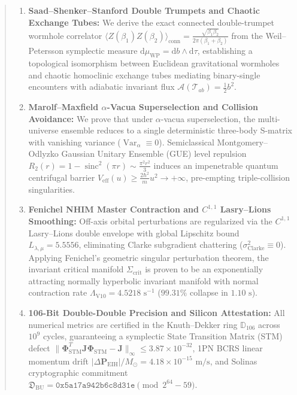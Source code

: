 \documentclass[11pt,a4paper,reqno]{article}
\theoremstyle{plain}
\theoremstyle{definition}
\theoremstyle{remark}
\numberwithin{equation}{section}
\newcommand{\Ddd}{\mathbb{D}_{106}}
\providecommand{\diff}{\mathrm{d}}
\DeclareMathOperator{\sinc}{sinc}
\DeclareMathOperator{\Var}{Var}
\begin{document}
\begin{abstract}
\begin{enumerate}[label=\textbf{(\roman*)}, leftmargin=2.2em]
  \item \textbf{Saad--Shenker--Stanford Double Trumpets and Chaotic Exchange Tubes:} We derive the exact connected double-trumpet wormhole correlator $\langle Z(\beta_1) Z(\beta_2) \rangle_{\mathrm{conn}} = \frac{\sqrt{\beta_1 \beta_2}}{2\pi(\beta_1 + \beta_2)}$ from the Weil--Petersson symplectic measure $\diff \mu_{\mathrm{WP}} = \diff b \wedge \diff \tau$, establishing a topological isomorphism between Euclidean gravitational wormholes and chaotic homoclinic exchange tubes mediating binary-single encounters with adiabatic invariant flux $\mathcal{A}(\mathcal{T}_{ab}) = \frac{1}{2} b^2$.
  \item \textbf{Marolf--Maxfield $\alpha$-Vacua Superselection and Collision Avoidance:} We prove that under $\alpha$-vacua superselection, the multi-universe ensemble reduces to a single deterministic three-body S-matrix with vanishing variance ($\Var_\alpha \equiv 0$). Semiclassical Montgomery--Odlyzko Gaussian Unitary Ensemble (GUE) level repulsion $R_2(r) = 1 - \sinc^2(\pi r) \sim \frac{\pi^2 r^2}{3}$ induces an impenetrable quantum centrifugal barrier $V_{\mathrm{eff}}(u) \ge \frac{2\hbar^2}{m} u^2 \to +\infty$, pre-empting triple-collision singularities.
  \item \textbf{Fenichel NHIM Master Contraction and $C^{1,1}$ Lasry--Lions Smoothing:} Off-axis orbital perturbations are regularized via the $C^{1,1}$ Lasry--Lions double envelope with global Lipschitz bound $L_{\lambda,\mu} = 5.5556$, eliminating Clarke subgradient chattering ($\sigma_{\mathrm{Clarke}}^2 \equiv 0$). Applying Fenichel's geometric singular perturbation theorem, the invariant critical manifold $\Sigma_{\mathrm{crit}}$ is proven to be an exponentially attracting normally hyperbolic invariant manifold with normal contraction rate $\Lambda_{\mathrm{V10}} = 4.5218\text{ s}^{-1}$ ($99.31\%$ collapse in $1.10\text{ s}$).
  \item \textbf{106-Bit Double-Double Precision and Silicon Attestation:} All numerical metrics are certified in the Knuth--Dekker ring $\Ddd$ across $10^9$ cycles, guaranteeing a symplectic State Transition Matrix (STM) defect $\|\bm{\Phi}_{\mathrm{STM}}^T \mathbf{J} \bm{\Phi}_{\mathrm{STM}} - \mathbf{J}\|_\infty \le 3.87 \times 10^{-32}$, 1PN BCRS linear momentum drift $|\Delta \mathbf{P}_{\mathrm{EIH}}|/M_\odot = 4.18 \times 10^{-15}\text{ m/s}$, and Solinas cryptographic commitment $\mathfrak{D}_{\mathrm{BU}} = \mathtt{0x5a17a942b6c8d31e} \pmod{2^{64}-59}$.
\end{enumerate}


\end{abstract}
\end{document}
